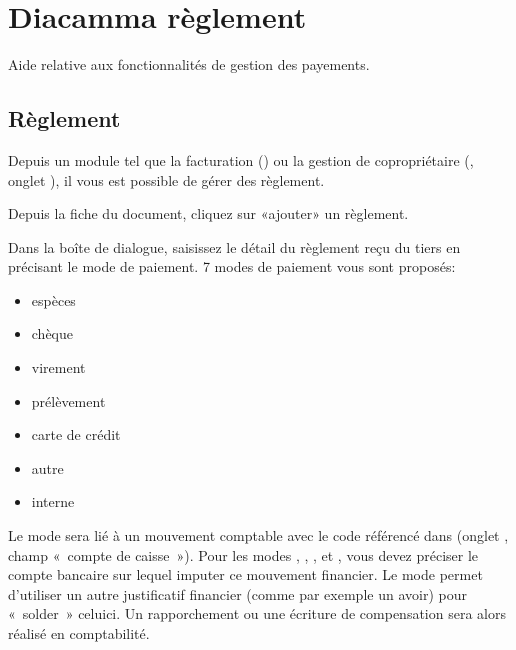 \documentclass[a4paper,10pt,oneside,french]{sphinxmanual}
\begin{document}
\chapter{Diacamma règlement}
\label{\detokenize{payoff/index:diacamma-reglement}}\label{\detokenize{payoff/index::doc}}
\sphinxAtStartPar
Aide relative aux fonctionnalités de gestion des payements.


\section{Règlement}
\label{\detokenize{payoff/payoff:reglement}}\label{\detokenize{payoff/payoff::doc}}
\sphinxAtStartPar
Depuis un module tel que la facturation () ou la gestion de copropriétaire (, onglet ), il vous est possible de gérer des règlement.

\sphinxAtStartPar
Depuis la fiche du document, cliquez sur «ajouter» un règlement.
\begin{quote}

\noindent{}
\end{quote}

\sphinxAtStartPar
Dans la boîte de dialogue, saisissez le détail du règlement reçu du tiers en précisant le mode de paiement.
7 modes de paiement vous sont proposés:
\begin{itemize}
\item {} 
\sphinxAtStartPar
espèces

\item {} 
\sphinxAtStartPar
chèque

\item {} 
\sphinxAtStartPar
virement

\item {} 
\sphinxAtStartPar
prélèvement

\item {} 
\sphinxAtStartPar
carte de crédit

\item {} 
\sphinxAtStartPar
autre

\item {} 
\sphinxAtStartPar
interne

\end{itemize}

\sphinxAtStartPar
Le mode  sera lié à un mouvement comptable avec le code référencé dans  (onglet , champ « compte de caisse »).
Pour les modes , , ,  et , vous devez préciser le compte bancaire sur lequel imputer ce mouvement financier.
Le mode  permet d’utiliser un autre justificatif financier (comme par exemple un avoir) pour « solder » celui\sphinxhyphen{}ci. Un rapporchement ou une écriture de compensation sera alors réalisé en comptabilité.
\end{document}
